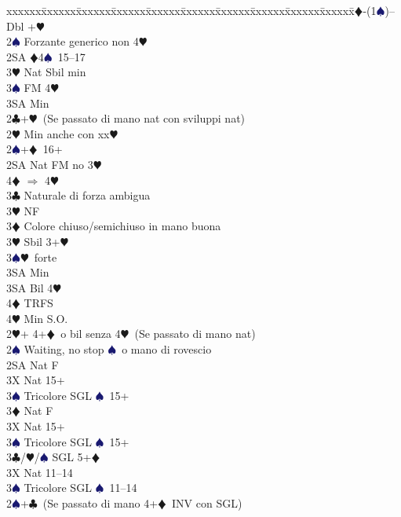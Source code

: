 \documentclass[a4paper,italian]{article}
\newcommand{\BC}{\textcolor{OliveGreen}{$\clubsuit$}}
\newcommand{\BD}{\textcolor{RedOrange}{$\vardiamondsuit$}}
\newcommand{\BH}{\textcolor{Red2}{$\varheartsuit${}}}
\newcommand{\BS}{\textcolor{MidnightBlue}{$\spadesuit${}}}
\newenvironment{bidtable}
{\begin{tabbing}

    xxxxxx\=xxxxxx\=xxxxxx\=xxxxxx\=xxxxxx\=xxxxxx\=xxxxxx\=xxxxxx\=xxxxxx\=xxxxxx\=\kill}
{\end{tabbing} }%
\begin{document}
\begin{multicols*}{2}
    \begin{bidtable}
        1\BD-(1\BS)--\+\\
        Dbl +\BH \+\\
        2\BS \> Forzante generico non 4\BH \\
        2SA \BD 4\BS\ 15--17\\
        3\BH \> Nat Sbil min\\
        3\BS \> FM 4\BH \+\\
        3SA \> Min\-\-\\
        2\BC {}+\BH\ (Se passato di mano nat con sviluppi nat)\+\\
        2\BH \> Min anche con xx\BH \\
        2\BS {}+\BD\  16+\\
        2SA \> Nat FM no 3\BH \+\\
        4\BD \> $\Rightarrow$ 4\BH\-\\
        3\BC \> Naturale di forza ambigua\+\\
        3\BH\> NF\-\\
        3\BD \> Colore chiuso/semichiuso in mano buona\\
        3\BH \> Sbil 3+\BH \\
        3\BS {}\BH\ forte\+\\
        3SA \> Min\-\\
        3SA \> Bil 4\BH \+\\
        4\BD \> TRFS\-\\
        4\BH \> Min S.O.\-\\
        2\BH {}+ 4+\BD\ o bil senza 4\BH\ (Se passato di mano nat)\+\\
        2\BS \> Waiting, no stop \BS\ o mano di rovescio\+\\
        2SA \> Nat F\+\\
        3X \> Nat 15+\\
        3\BS \> Tricolore SGL \BS\ 15+\-\\
        3\BD \> Nat F\+\\
        3X \> Nat 15+\\
        3\BS \> Tricolore SGL \BS\ 15+\-\\
        3\BC/\BH/\BS \> SGL 5+\BD \-\\
        3X \> Nat 11--14\\
        3\BS \> Tricolore SGL \BS\  11--14\-\\
        2\BS {}+\BC\ (Se passato di mano 4+\BD\ INV con SGL)\+\\

\end{bidtable}
\end{multicols*}
\end{document}
